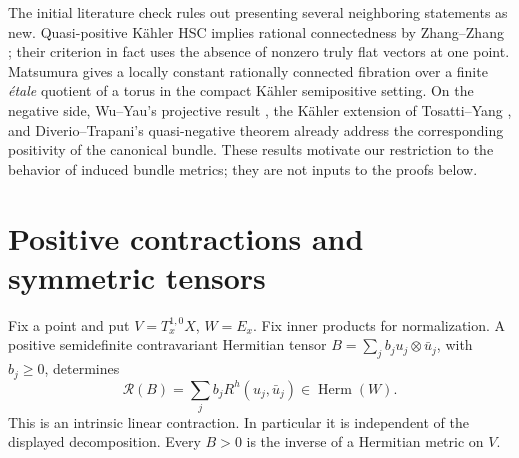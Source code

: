 \documentclass[12pt]{amsart}
\theoremstyle{definition}
\theoremstyle{remark}
\numberwithin{equation}{section}
\theoremstyle{definition}
\begin{document}
The initial literature check rules out presenting several neighboring
statements as new. Quasi-positive K\"ahler HSC implies rational
connectedness by Zhang--Zhang \cite[Theorem 1.5]{en:ZZ}; their criterion
in fact uses the absence of nonzero truly flat vectors at one point.
Matsumura \cite[Theorem 1.1 and Remark 1.2]{en:Mat} gives a locally
constant rationally connected fibration over a finite \emph{\'etale}
quotient of a torus in the compact K\"ahler semipositive setting.
On the negative side, Wu--Yau's projective result
\cite[Theorem 2]{en:WY}, the K\"ahler extension of Tosatti--Yang
\cite[Theorem 1.1 and Corollary 1.2]{en:TY}, and Diverio--Trapani's
quasi-negative theorem \cite[Theorem 1.2]{en:DT} already address the
corresponding positivity of the canonical bundle. These results motivate
our restriction to the behavior of induced bundle metrics; they are not
inputs to the proofs below.

\section{Positive contractions and symmetric tensors}
\label{en:proofmain}

Fix a point and put $V=T_x^{1,0}X$, $W=E_x$. Fix inner products for
normalization. A positive semidefinite contravariant Hermitian tensor
$B=\sum_j b_j u_j\otimes\bar u_j$, with $b_j\geq0$, determines
\begin{equation}\label{en:contraction}
 \mathcal R(B)=\sum_j b_jR^h(u_j,\bar u_j)\in\operatorname{Herm}(W).
\end{equation}
This is an intrinsic linear contraction. In particular it is independent
of the displayed decomposition. Every $B>0$ is the inverse of a
Hermitian metric on $V$.
\end{document}
